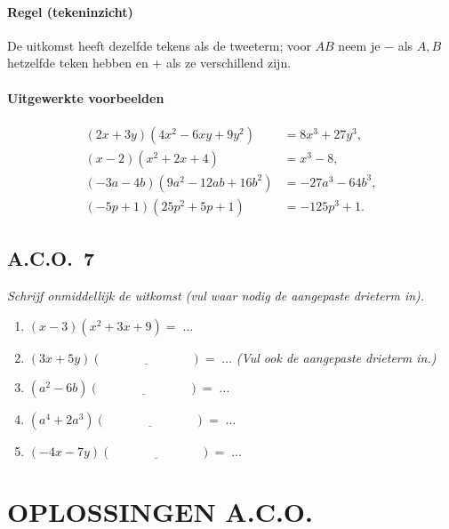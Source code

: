 \documentclass[a4paper,12pt]{article}
\begin{document}
\paragraph*{Regel (tekeninzicht)}
De uitkomst heeft dezelfde tekens als de tweeterm; voor \(AB\) neem je \(-\) als \(A,B\) hetzelfde teken hebben en \(+\) als ze verschillend zijn.

\paragraph*{Uitgewerkte voorbeelden}
\[
\begin{aligned}
(2x+3y)(4x^2-6xy+9y^2)&=8x^3+27y^3,\\
(x-2)(x^2+2x+4)&=x^3-8,\\
({-}3a-4b)(9a^2-12ab+16b^2)&={-}27a^3-64b^3,\\
({-}5p+1)(25p^2+5p+1)&={-}125p^3+1.
\end{aligned}
\]

\subsection*{A.C.O.\ 7}
\emph{Schrijf onmiddellijk de uitkomst (vul waar nodig de aangepaste drieterm in).}
\begin{enumerate}
  \item \((x-3)(x^2+3x+9)=\;\ldots\)
  \item \((3x+5y)(\underline{\hspace{3cm}})=\;\ldots\) \quad \emph{(Vul ook de aangepaste drieterm in.)}
  \item \((a^2-6b)(\underline{\hspace{3cm}})=\;\ldots\)
  \item \((a^4+2a^3)(\underline{\hspace{3cm}})=\;\ldots\)
  \item \(({-}4x-7y)(\underline{\hspace{3cm}})=\;\ldots\)
\end{enumerate}

\section*{OPLOSSINGEN A.C.O.}
\end{document}
